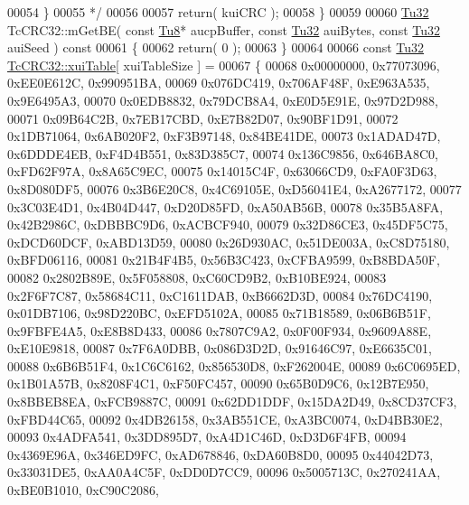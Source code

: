 \begin{DoxyCode}
00054 \textcolor{comment}{   \}}
00055 \textcolor{comment}{   */}
00056 
00057    \textcolor{keywordflow}{return}( kuiCRC );
00058 \}
00059 
00060 \mbox{\hyperlink{namespace_g_n_common_a941b527ef318f318aed7903dc832b7e4}{Tu32}} TcCRC32::mGetBE( \textcolor{keyword}{const} \mbox{\hyperlink{namespace_g_n_common_a7939e251ddbf5d3a31832dcfdc8bde39}{Tu8}}* aucpBuffer, \textcolor{keyword}{const} \mbox{\hyperlink{namespace_g_n_common_a941b527ef318f318aed7903dc832b7e4}{Tu32}} auiBytes, \textcolor{keyword}{const} 
      \mbox{\hyperlink{namespace_g_n_common_a941b527ef318f318aed7903dc832b7e4}{Tu32}} auiSeed )\textcolor{keyword}{ const}
00061 \textcolor{keyword}{}\{
00062    \textcolor{keywordflow}{return}( 0 );
00063 \}
00064 
00066 \textcolor{keyword}{const} \mbox{\hyperlink{namespace_g_n_common_a941b527ef318f318aed7903dc832b7e4}{Tu32}} \mbox{\hyperlink{class_g_n_common_1_1_n_data_authentication_1_1_tc_c_r_c32_a2c841dc8051fc7e1719224929f24b32d}{TcCRC32::xuiTable}}[ xuiTableSize ] =
00067 \{
00068    0x00000000, 0x77073096, 0xEE0E612C, 0x990951BA,
00069    0x076DC419, 0x706AF48F, 0xE963A535, 0x9E6495A3,
00070    0x0EDB8832, 0x79DCB8A4, 0xE0D5E91E, 0x97D2D988,
00071    0x09B64C2B, 0x7EB17CBD, 0xE7B82D07, 0x90BF1D91,
00072    0x1DB71064, 0x6AB020F2, 0xF3B97148, 0x84BE41DE,
00073    0x1ADAD47D, 0x6DDDE4EB, 0xF4D4B551, 0x83D385C7,
00074    0x136C9856, 0x646BA8C0, 0xFD62F97A, 0x8A65C9EC,
00075    0x14015C4F, 0x63066CD9, 0xFA0F3D63, 0x8D080DF5,
00076    0x3B6E20C8, 0x4C69105E, 0xD56041E4, 0xA2677172,
00077    0x3C03E4D1, 0x4B04D447, 0xD20D85FD, 0xA50AB56B,
00078    0x35B5A8FA, 0x42B2986C, 0xDBBBC9D6, 0xACBCF940,
00079    0x32D86CE3, 0x45DF5C75, 0xDCD60DCF, 0xABD13D59,
00080    0x26D930AC, 0x51DE003A, 0xC8D75180, 0xBFD06116,
00081    0x21B4F4B5, 0x56B3C423, 0xCFBA9599, 0xB8BDA50F,
00082    0x2802B89E, 0x5F058808, 0xC60CD9B2, 0xB10BE924,
00083    0x2F6F7C87, 0x58684C11, 0xC1611DAB, 0xB6662D3D,
00084    0x76DC4190, 0x01DB7106, 0x98D220BC, 0xEFD5102A,
00085    0x71B18589, 0x06B6B51F, 0x9FBFE4A5, 0xE8B8D433,
00086    0x7807C9A2, 0x0F00F934, 0x9609A88E, 0xE10E9818,
00087    0x7F6A0DBB, 0x086D3D2D, 0x91646C97, 0xE6635C01,
00088    0x6B6B51F4, 0x1C6C6162, 0x856530D8, 0xF262004E,
00089    0x6C0695ED, 0x1B01A57B, 0x8208F4C1, 0xF50FC457,
00090    0x65B0D9C6, 0x12B7E950, 0x8BBEB8EA, 0xFCB9887C,
00091    0x62DD1DDF, 0x15DA2D49, 0x8CD37CF3, 0xFBD44C65,
00092    0x4DB26158, 0x3AB551CE, 0xA3BC0074, 0xD4BB30E2,
00093    0x4ADFA541, 0x3DD895D7, 0xA4D1C46D, 0xD3D6F4FB,
00094    0x4369E96A, 0x346ED9FC, 0xAD678846, 0xDA60B8D0,
00095    0x44042D73, 0x33031DE5, 0xAA0A4C5F, 0xDD0D7CC9,
00096    0x5005713C, 0x270241AA, 0xBE0B1010, 0xC90C2086,

\end{DoxyCode}
